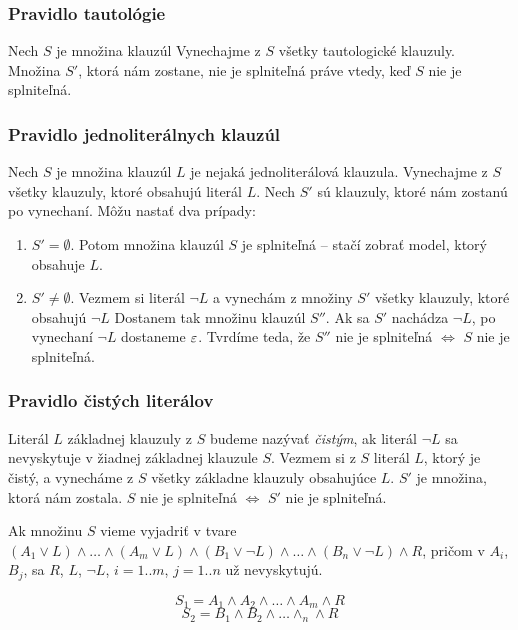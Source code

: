 \subsubsection{Pravidlo tautológie} 
Nech $S$ je množina klauzúl
Vynechajme z $S$ všetky tautologické klauzuly.
Množina $S'$, ktorá nám zostane, nie je splniteľná práve vtedy,
keď $S$ nie je splniteľná.

\subsubsection{Pravidlo jednoliterálnych klauzúl}
Nech $S$ je množina klauzúl $L$ je nejaká jednoliterálová klauzula.
Vynechajme z $S$ všetky klauzuly, ktoré obsahujú literál $L$.
Nech $S'$ sú klauzuly, ktoré nám zostanú po vynechaní.
Môžu nastať dva prípady:
\begin{enumerate}
    \item $S' = \emptyset$. Potom množina klauzúl $S$ je splniteľná --
        stačí zobrať model, ktorý obsahuje $L$.

    \item $S' \neq \emptyset$. Vezmem si literál $\neg L$ a vynechám z
        množiny $S'$ všetky klauzuly, ktoré obsahujú $\neg L$
        Dostanem tak množinu klauzúl $S''$.
        Ak sa $S'$ nachádza $\neg L$, po vynechaní
        $\neg L$ dostaneme $\varepsilon$.
        Tvrdíme teda, že $S''$ nie je splniteľná
        $\iff$ $S$ nie je splniteľná.
\end{enumerate}

\startFIXME

\subsubsection{Pravidlo čistých literálov}
Literál $L$ základnej klauzuly z $S$ budeme nazývať \emph{čistým},
ak literál $\neg L$ sa nevyskytuje v žiadnej základnej klauzule $S$.
Vezmem si z $S$ literál $L$, ktorý je čistý, a
vynecháme z $S$ všetky základne klauzuly obsahujúce $L$.
$S'$ je množina, ktorá nám zostala.
$S$ nie je splniteľná $\iff$ $S'$ nie je splniteľná.

Ak množinu $S$ vieme vyjadriť v tvare
$(A_1 \lor L) \land \ldots \land (A_m \lor L) \land 
 (B_1 \lor \neg L) \land \ldots \land (B_n \lor \neg L) \land R$,
pričom v $A_i$, $B_j$, sa $R$, $L$, $\neg L$, $i=1..m$,
$j=1..n$ už nevyskytujú.

$$S_1 = A_1 \land A_2 \land \ldots \land A_m \land R$$
$$S_2 = B_1 \land B_2 \land \ldots \land _n \land R$$

